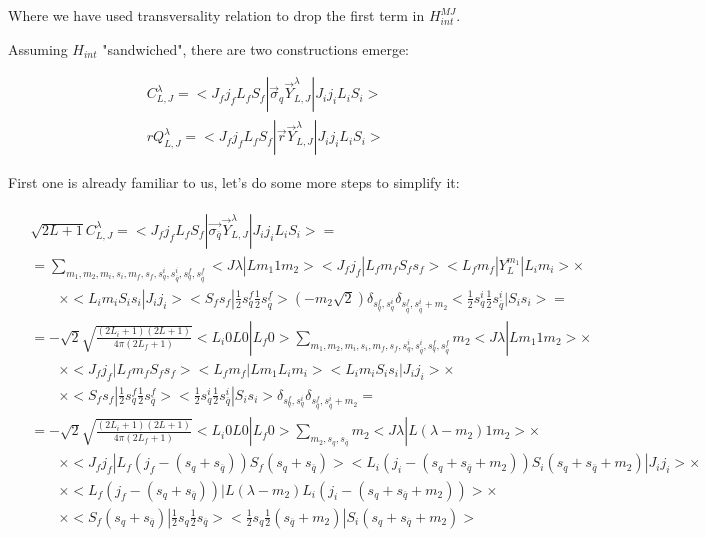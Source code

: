Where we have used transversality relation to drop the first term in $H_{int}^{MJ}$.

Assuming $H_{int}$ "sandwiched", there are two constructions emerge:

\begin{align}
    &C_{L, J}^\lambda = <J_f j_f L_f S_f|\vec{\sigma}_{q} \vec{Y}^{\lambda}_{L, J}|J_i j_i L_i S_i> \\
    &r Q_{L, J}^\lambda = <J_f j_f L_f S_f|\vec{r} \vec{Y}^{\lambda}_{L, J}|J_i j_i L_i S_i>
\end{align}

First one is already familiar to us, let's do some more steps to simplify it:

\begin{align}
    \begin{split}
        &\sqrt{2L+1} C_{L, J}^\lambda = <J_f j_f L_f S_f| \vec{\sigma_{\overline{q}}} \vec{Y}_{L, J}^\lambda |J_i j_i L_i S_i> = \\
        &= \sum_{m_1, m_2, m_i, s_i, m_f, s_f, s^i_{q}, s^{i}_{\overline{q}}, s^{f}_{q}, s^{f}_{\overline{q}}} <J \lambda| L m_1 1 m_2> <J_f j_f| L_f m_f S_f s_f> <L_f m_f| Y_{L}^{m_1} |L_i m_i> \times \\
        &\qquad\times <L_i m_i S_i s_i| J_i j_i> <S_f s_f| \frac{1}{2} s^f_{q} \frac{1}{2} s^f_{\overline{q}}>  (-m_2\sqrt{2}) \delta_{s^f_{q}, s^{i}_{q}} \delta_{s^f_{\overline{q}}, s^i_{\overline{q}} + m_2} <\frac{1}{2} s^i_{q} \frac{1}{2} s^i_{\overline{q}} |S_i s_i> = \\
        &= -\sqrt{2}\sqrt{\frac{(2L_i + 1)(2L+1)}{4 \pi (2L_f + 1)}} <L_i 0 L 0 | L_f 0> \sum_{m_1, m_2, m_i, s_i, m_f, s_f, s^i_{q}, s^{i}_{\overline{q}}, s^{f}_{q}, s^{f}_{\overline{q}}} m_2 <J \lambda| L m_1 1 m_2> \times\\
        &\qquad\times <J_f j_f| L_f m_f S_f s_f> <L_f m_f| L m_1 L_i m_i>  <L_i m_i S_i s_i| J_i j_i> \times\\
        &\qquad\times <S_f s_f| \frac{1}{2} s^f_{q} \frac{1}{2} s^f_{\overline{q}}> <\frac{1}{2} s^i_{q} \frac{1}{2} s^i_{\overline{q}} |S_i s_i> \delta_{s^f_{q}, s^{i}_{q}} \delta_{s^f_{\overline{q}}, s^i_{\overline{q}}+m_2} = \\
    &= -\sqrt{2}\sqrt{\frac{(2L_i + 1)(2L+1)}{4 \pi (2L_f + 1)}} <L_i 0 L 0 | L_f 0> \sum_{m_2, s_{q}, s_{\overline{q}}} m_2 <J \lambda| L (\lambda - m_2) 1 m_2> \times\\
        &\qquad\times <J_f j_f| L_f (j_f-(s_q + s_{\overline{q}})) S_f (s_q + s_{\overline{q}})> <L_i (j_i - (s_q + s_{\overline{q}} + m_2)) S_i (s_q + s_{\overline{q}} + m_2)| J_i j_i> \times \\
        &\qquad\times <L_f (j_f - (s_q + s_{\overline{q}}))| L (\lambda - m_2) L_i (j_i - (s_q + s_{\overline{q}}+m_2))>  \times\\
        &\qquad\times <S_f (s_q + s_{\overline{q}})| \frac{1}{2} s_{q} \frac{1}{2} s_{\overline{q}}> <\frac{1}{2} s_{q} \frac{1}{2} (s_{\overline{q}} + m_2) |S_i (s_q + s_{\overline{q}} + m_2)>
    \end{split}
\end{align}

